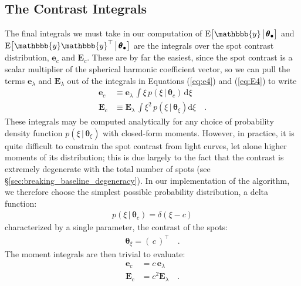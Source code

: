 \documentclass[modern]{aastex62}
\begin{document}
\subsection{The Contrast Integrals}
\label{sec:contrast}
%
The final integrals we must take in our computation of
$\mathrm{E} \big[ \mathbbb{y} \, \big| \, \pmb{\theta}_\bullet \big]$
and $\mathrm{E} \big[ \mathbbb{y} \mathbbb{y}^\top \, \big| \, \pmb{\theta}_\bullet \big]$
are the integrals over
the spot contrast distribution, $\mathbf{e}_c$ and $\mathbf{E}_c$.
These are by far the easiest, since the spot contrast is a scalar
multiplier of the spherical harmonic coefficient vector, so we can
pull the terms $\mathbf{e}_\lambda$ and $\mathbf{E}_\lambda$ out
of the
integrals in Equations (\ref{eq:e4}) and (\ref{eq:E4}) to write
%
\begin{align}
    \mathbf{e}_c
     & \equiv
    \mathbf{e}_\lambda \,
    \int
    \xi \,
    p(\xi \, \big| \, \pmb{\theta}_{c}) \,
    \mathrm{d}\xi
    \\
    \mathbf{E}_c
     & \equiv
    \mathbf{E}_\lambda \,
    \int
    \xi^2 \,
    p(\xi \, \big| \, \pmb{\theta}_\xi)
    \mathrm{d}\xi
    \quad.
\end{align}
%
These integrals may be computed analytically for any choice of
probability density function $p(\xi \, \big| \, \pmb{\theta}_\xi)$
with closed-form moments.
%
However, in practice, it is quite difficult to constrain the
spot contrast from light curves, let alone higher moments of its
distribution; this is due largely to the fact that the contrast
is extremely degenerate with the total number of spots
(see \S\ref{sec:breaking_baseline_degeneracy}).
%
In our implementation of the algorithm,
we therefore choose the simplest possible probability distribution,
a delta function:
%
\begin{align}
    p(\xi \, \big| \, \pmb{\theta}_{c}) = \delta(\xi - c)
\end{align}
%
characterized by a single parameter, the contrast of the spots:
%
\begin{align}
    \pmb{\theta}_\xi = \left( \, c \, \right)^\top
    \quad.
\end{align}
%
The moment integrals are then trivial to evaluate:
%
\begin{align}
    \mathbf{e}_c & = c \, \mathbf{e}_\lambda
    \\
    \mathbf{E}_c & = c^2 \mathbf{E}_\lambda
    \quad.
\end{align}
%
\end{document}
